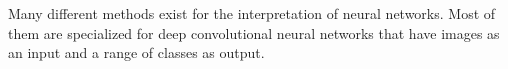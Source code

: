 \label{chapter_methods}
Many different methods exist for the interpretation of neural networks. Most of them are specialized for deep convolutional neural networks that have images as an input and a range of classes as output.
